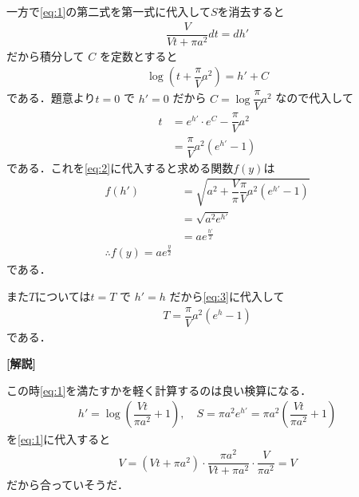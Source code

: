 \documentclass[../../main.tex]{subfiles}
\begin{document}
一方で\cref{eq:1}の第二式を第一式に代入して$S$を消去すると
\begin{align}
  \dfrac{V}{Vt + \pi a^2} dt = dh'
\end{align}
だから積分して $C$ を定数とすると
\begin{align}
  \log \left( t + \dfrac{\pi}{V} a^2 \right) = h' + C
\end{align}
である．題意より$t=0$ で $h'=0$ だから $C = \log \dfrac{\pi}{V} a^2$ なので代入して
\begin{align}
  t &= e^{h'} \cdot e^C - \dfrac{\pi}{V} a^2 \\
  &= \dfrac{\pi}{V} a^2 (e^{h'} - 1) \label{eq:3}
\end{align}
である．これを\cref{eq:2}に代入すると求める関数$f(y)$は
\begin{align}
  f(h')
  &= \sqrt{a^2+\dfrac{V}{\pi}\dfrac{\pi}{V} a^2 (e^{h'} - 1) } \\
  &=\sqrt{a^2 e^{h'} } \\
  &= ae^{\frac{h'}{2}} \\
  \therefore
  f(y) = ae^{\frac{y}{2}} \label{eq:4}
\end{align}
である．

また$T$については$t=T$ で $h'=h$ だから\cref{eq:3}に代入して
\begin{align}
  T = \dfrac{\pi}{V} a^2 (e^h - 1)
\end{align}
である．

{\bf [解説]}

この時\cref{eq:1}を満たすかを軽く計算するのは良い検算になる．
\begin{align}
  h' = \log \left( \dfrac{V t}{\pi a^2} + 1 \right), \quad S = \pi a^2 e^{h'} = \pi a^2 \left( \dfrac{V t}{\pi a^2} + 1 \right)
\end{align}
を\cref{eq:1}に代入すると
\begin{align}
  V = (V t + \pi a^2) \cdot \dfrac{\pi a^2}{Vt + \pi a^2} \cdot \dfrac{V}{\pi a^2} = V
\end{align}
だから合っていそうだ．
\end{document}
